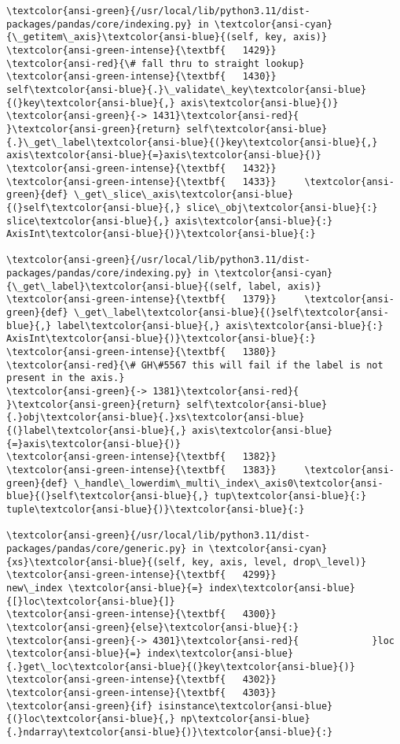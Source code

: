 \documentclass[11pt]{article}
\begin{document}
\begin{Verbatim}[commandchars=\\\{\}, frame=single, framerule=2mm, rulecolor=\color{outerrorbackground}]
\textcolor{ansi-green}{/usr/local/lib/python3.11/dist-packages/pandas/core/indexing.py} in \textcolor{ansi-cyan}{\_getitem\_axis}\textcolor{ansi-blue}{(self, key, axis)}
\textcolor{ansi-green-intense}{\textbf{   1429}}         \textcolor{ansi-red}{\# fall thru to straight lookup}
\textcolor{ansi-green-intense}{\textbf{   1430}}         self\textcolor{ansi-blue}{.}\_validate\_key\textcolor{ansi-blue}{(}key\textcolor{ansi-blue}{,} axis\textcolor{ansi-blue}{)}
\textcolor{ansi-green}{-> 1431}\textcolor{ansi-red}{         }\textcolor{ansi-green}{return} self\textcolor{ansi-blue}{.}\_get\_label\textcolor{ansi-blue}{(}key\textcolor{ansi-blue}{,} axis\textcolor{ansi-blue}{=}axis\textcolor{ansi-blue}{)}
\textcolor{ansi-green-intense}{\textbf{   1432}} 
\textcolor{ansi-green-intense}{\textbf{   1433}}     \textcolor{ansi-green}{def} \_get\_slice\_axis\textcolor{ansi-blue}{(}self\textcolor{ansi-blue}{,} slice\_obj\textcolor{ansi-blue}{:} slice\textcolor{ansi-blue}{,} axis\textcolor{ansi-blue}{:} AxisInt\textcolor{ansi-blue}{)}\textcolor{ansi-blue}{:}

\textcolor{ansi-green}{/usr/local/lib/python3.11/dist-packages/pandas/core/indexing.py} in \textcolor{ansi-cyan}{\_get\_label}\textcolor{ansi-blue}{(self, label, axis)}
\textcolor{ansi-green-intense}{\textbf{   1379}}     \textcolor{ansi-green}{def} \_get\_label\textcolor{ansi-blue}{(}self\textcolor{ansi-blue}{,} label\textcolor{ansi-blue}{,} axis\textcolor{ansi-blue}{:} AxisInt\textcolor{ansi-blue}{)}\textcolor{ansi-blue}{:}
\textcolor{ansi-green-intense}{\textbf{   1380}}         \textcolor{ansi-red}{\# GH\#5567 this will fail if the label is not present in the axis.}
\textcolor{ansi-green}{-> 1381}\textcolor{ansi-red}{         }\textcolor{ansi-green}{return} self\textcolor{ansi-blue}{.}obj\textcolor{ansi-blue}{.}xs\textcolor{ansi-blue}{(}label\textcolor{ansi-blue}{,} axis\textcolor{ansi-blue}{=}axis\textcolor{ansi-blue}{)}
\textcolor{ansi-green-intense}{\textbf{   1382}} 
\textcolor{ansi-green-intense}{\textbf{   1383}}     \textcolor{ansi-green}{def} \_handle\_lowerdim\_multi\_index\_axis0\textcolor{ansi-blue}{(}self\textcolor{ansi-blue}{,} tup\textcolor{ansi-blue}{:} tuple\textcolor{ansi-blue}{)}\textcolor{ansi-blue}{:}

\textcolor{ansi-green}{/usr/local/lib/python3.11/dist-packages/pandas/core/generic.py} in \textcolor{ansi-cyan}{xs}\textcolor{ansi-blue}{(self, key, axis, level, drop\_level)}
\textcolor{ansi-green-intense}{\textbf{   4299}}                     new\_index \textcolor{ansi-blue}{=} index\textcolor{ansi-blue}{[}loc\textcolor{ansi-blue}{]}
\textcolor{ansi-green-intense}{\textbf{   4300}}         \textcolor{ansi-green}{else}\textcolor{ansi-blue}{:}
\textcolor{ansi-green}{-> 4301}\textcolor{ansi-red}{             }loc \textcolor{ansi-blue}{=} index\textcolor{ansi-blue}{.}get\_loc\textcolor{ansi-blue}{(}key\textcolor{ansi-blue}{)}
\textcolor{ansi-green-intense}{\textbf{   4302}} 
\textcolor{ansi-green-intense}{\textbf{   4303}}             \textcolor{ansi-green}{if} isinstance\textcolor{ansi-blue}{(}loc\textcolor{ansi-blue}{,} np\textcolor{ansi-blue}{.}ndarray\textcolor{ansi-blue}{)}\textcolor{ansi-blue}{:}


\end{Verbatim}
\end{document}
